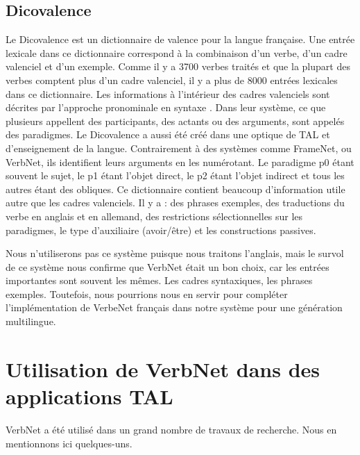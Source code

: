 \subsection{Dicovalence}
Le Dicovalence est un dictionnaire de valence pour la langue française. Une entrée lexicale dans ce dictionnaire correspond à la combinaison d'un verbe, d'un cadre valenciel et d'un exemple. Comme il y a 3700 verbes traités et que la plupart des verbes comptent plus d'un cadre valenciel, il y a plus de 8000 entrées lexicales dans ce dictionnaire. Les informations à l'intérieur des cadres valenciels sont décrites par l'approche pronominale en syntaxe \citep{11403/dicovalence/v1}. Dans leur système, ce que plusieurs appellent des participants, des actants ou des arguments, sont appelés des paradigmes. Le Dicovalence a aussi été créé dans une optique de TAL et d'enseignement de la langue. Contrairement à des systèmes comme FrameNet, ou VerbNet, ils identifient leurs arguments en les numérotant. Le paradigme p0 étant souvent le sujet, le p1 étant l'objet direct, le p2 étant l'objet indirect et tous les autres étant des obliques. Ce dictionnaire contient beaucoup d'information utile autre que les cadres valenciels. Il y a : des phrases exemples, des traductions du verbe en anglais et en allemand, des restrictions sélectionnelles sur les paradigmes, le type d'auxiliaire (avoir/être) et les constructions passives.

Nous n'utiliserons pas ce système puisque nous traitons l'anglais, mais le survol de ce système nous confirme que VerbNet était un bon choix, car les entrées importantes sont souvent les mêmes. Les cadres syntaxiques, les phrases exemples. Toutefois, nous pourrions nous en servir pour compléter l'implémentation de VerbeNet français dans notre système pour une génération multilingue.


\section {Utilisation de VerbNet dans des applications TAL}

VerbNet a été utilisé dans un grand nombre de travaux de recherche. Nous en mentionnons ici quelques-uns.

